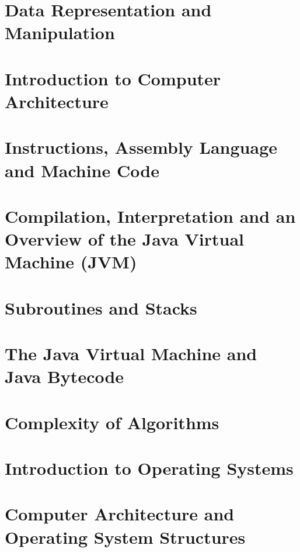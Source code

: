 \documentclass[
  11pt,
  a4paper,
]{article}
\begin{document}
\section{Data Representation and Manipulation}


\section{Introduction to Computer Architecture}


\section{Instructions, Assembly Language and Machine Code}


\section[Compilation, Interpretation and the JVM]{Compilation, Interpretation and an Overview of the Java Virtual Machine (JVM)}


\section{Subroutines and Stacks}


\section[The JVM and Java Bytecode]{The Java Virtual Machine and Java Bytecode}


\section{Complexity of Algorithms}



\section{Introduction to Operating Systems}


\section[Computer Architecture and OS Structures]{Computer Architecture and Operating System Structures}

\end{document}

